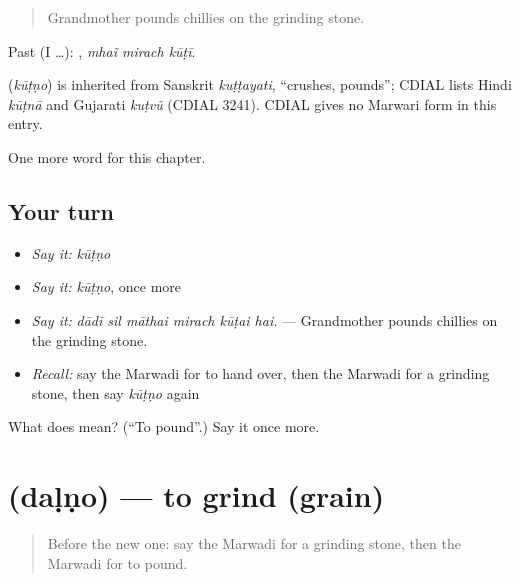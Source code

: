 \begin{quote}
Grandmother pounds chillies on the grinding stone.
\end{quote}

Past (I …):   , \emph{mhaĩ mirach kūṭī}.

\begin{cousinweb}
\textbf{} (\emph{kūṭṇo}) is inherited from Sanskrit \emph{kuṭṭayati}, \textquotedblleft{}crushes, pounds\textquotedblright{}; CDIAL lists Hindi \emph{kūṭnā} and Gujarati \emph{kuṭvũ} (CDIAL 3241). CDIAL gives no Marwari form in this entry.
\end{cousinweb}

\begin{grammarlens}[title={What you've built}]
One more word for this chapter.
\end{grammarlens}

\subsection*{Your turn}
\begin{itemize}
\raggedright
  \item \emph{Say it:} \emph{kūṭṇo}
  \item \emph{Say it:} \emph{kūṭṇo}, once more
  \item \emph{Say it:} \emph{dādī sil māthai mirach kūṭai hai.} — Grandmother pounds chillies on the grinding stone.
  \item \emph{Recall:} say the Marwadi for to hand over, then the Marwadi for a grinding stone, then say \emph{kūṭṇo} again
\end{itemize}

\begin{tcolorbox}[breakable,colback=teal!4,colframe=teal!35!black,title={Before you move on}]
What does  mean? (\textquotedblleft{}To pound\textquotedblright{}.) Say it once more.
\end{tcolorbox}
\section[\texorpdfstring{\mw{दळणो} (daḷṇo)}{दळणो (daḷṇo)}]{ (daḷṇo) — to grind (grain)}

\label{lesson:MW-C179-dalno}



\begin{quote}
Before the new one: say the Marwadi for a grinding stone, then the Marwadi for to pound.
\end{quote}

